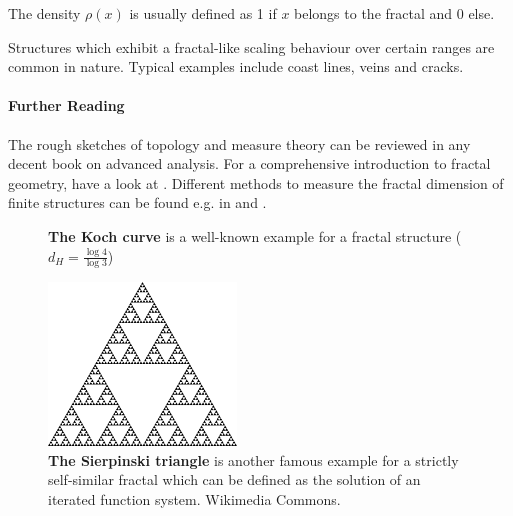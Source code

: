 \documentclass[twocolumn,10pt]{scrartcl}
\begin{document}
            The density $\rho(x)$ is usually defined as 1 if $x$ belongs to the fractal and 0 else.

            Structures which exhibit a fractal-like scaling behaviour over certain ranges are common in nature. Typical
            examples include coast lines, veins and cracks.

        {\small
            \paragraph{Further Reading}
            The rough sketches of topology and measure theory can be reviewed in any decent book on advanced analysis.
            For a comprehensive introduction to fractal geometry, have a look at \cite{src-mandelbrot}. Different
            methods to measure the fractal dimension of finite structures can be found e.g. in \cite{src-stanley} and
            \cite{src-wittensander}.
        }

        \begin{figure}
            \center
            \caption[The Koch curve]
                {\small\textbf{The Koch curve} is a well-known example for a fractal structure ($d_H=\frac{\log 4}
                    {\log 3}$)}
            \label{fig-koch}
        \end{figure}

        \begin{figure}
            \center
            \includegraphics[width=5cm]{img/sierpinski.png}
            \caption[The Sierpinski Triangle]
                {\small\textbf{The Sierpinski triangle} is another famous example for a strictly self-similar fractal
                which can be defined as the solution of an iterated function system. Wikimedia Commons.}
            \label{fig-sierpinski}
        \end{figure}
\end{document}
